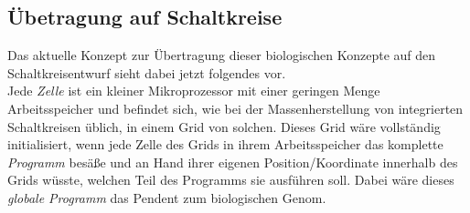 \documentclass[12p, a4]{article}
\begin{document}
\subsection{Übetragung auf Schaltkreise}
Das aktuelle Konzept zur Übertragung dieser biologischen Konzepte auf den
Schaltkreisentwurf sieht dabei jetzt folgendes vor.\\Jede \textit{Zelle}
ist ein kleiner Mikroprozessor mit einer geringen Menge Arbeitsspeicher und
befindet sich, wie bei der Massenherstellung von integrierten Schaltkreisen
üblich, in einem Grid von solchen.
Dieses Grid wäre vollständig initialisiert, wenn jede Zelle des Grids in
ihrem Arbeitsspeicher das komplette \textit{Programm} besäße und an Hand
ihrer eigenen Position/Koordinate innerhalb des Grids wüsste, welchen
Teil des Programms sie ausführen soll. Dabei wäre dieses \textit{globale
Programm} das Pendent zum biologischen Genom.\\
\end{document}
